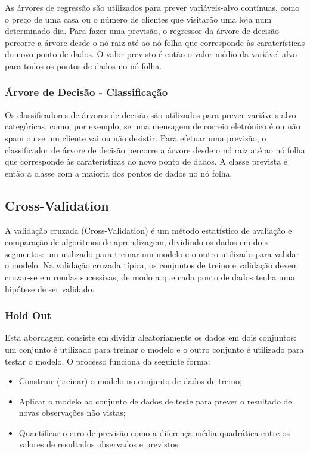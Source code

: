 \documentclass[conference]{IEEEtran}
\begin{document}
As árvores de regressão são utilizados para prever variáveis-alvo contínuas, como o preço de uma casa ou o número de clientes que visitarão uma loja num determinado dia. Para fazer uma previsão, o regressor da árvore de decisão percorre a árvore desde o nó raiz até ao nó folha que corresponde às caraterísticas do novo ponto de dados. O valor previsto é então o valor médio da variável alvo para todos os pontos de dados no nó folha. \cite{ohekar_what_2023}

\medskip
\subsubsection{Árvore de Decisão - Classificação}

Os classificadores de árvores de decisão são utilizados para prever variáveis-alvo categóricas, como, por exemplo, se uma mensagem de correio eletrónico é ou não spam ou se um cliente vai ou não desistir. Para efetuar uma previsão, o classificador de árvore de decisão percorre a árvore desde o nó raiz até ao nó folha que corresponde às caraterísticas do novo ponto de dados. A classe prevista é então a classe com a maioria dos pontos de dados no nó folha. \cite{ohekar_what_2023}

\subsection{Cross-Validation}

A validação cruzada (Cross-Validation) é um método estatístico de avaliação e comparação de algoritmos de aprendizagem, dividindo os dados em dois segmentos: um utilizado para treinar um modelo e o outro utilizado para validar o modelo. Na validação cruzada típica, os conjuntos de treino e validação devem cruzar-se em rondas sucessivas, de modo a que cada ponto de dados tenha uma hipótese de ser validado. \cite{refaeilzadeh_cross-validation_2009}

\medskip
\subsubsection{Hold Out}

Esta abordagem consiste em dividir aleatoriamente os dados em dois conjuntos: um conjunto é utilizado para treinar o modelo e o outro conjunto é utilizado para testar o modelo. O processo funciona da seguinte forma: 
\begin{itemize}
	\item Construir (treinar) o modelo no conjunto de dados de treino; 
	\item Aplicar o modelo ao conjunto de dados de teste para prever o resultado de novas observações não vistas; 
	\item Quantificar o erro de previsão como a diferença média quadrática entre os valores de resultados observados e previstos. \cite{madureira2024cv}
\end{itemize}
\end{document}
